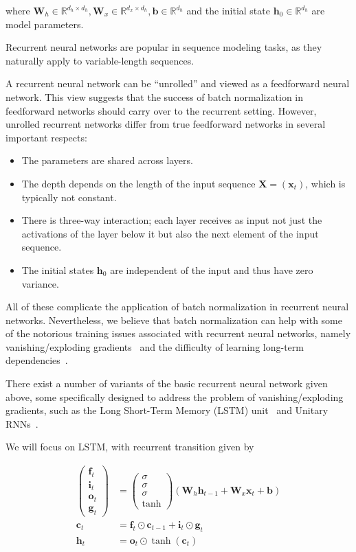 \documentclass{article} %
\newcommand{\vect}[1]{\mathbf{#1}}
\newcommand{\mat}[1]{\mathbf{#1}}
\newcommand{\ewprod}{\odot}
\newcommand{\reals}{\mathbb{R}}
\begin{document}
where $\mat{W}_h \in \reals^{d_h \times d_h},
       \mat{W}_x \in \reals^{d_x \times d_h},
       \vect{b} \in \reals^{d_h}$
  and the initial state $\vect{h}_0 \in \reals^{d_h}$
  are model parameters.

Recurrent neural networks are popular in sequence modeling tasks, as they naturally apply to variable-length sequences.

A recurrent neural network can be ``unrolled'' and viewed as a feedforward neural network.
This view suggests that the success of batch normalization in feedforward networks should carry over to the recurrent setting.
However, unrolled recurrent networks differ from true feedforward networks in several important respects:
\begin{itemize}
\item The parameters are shared across layers.
\item The depth depends on the length of the input sequence $\mat{X} = (\vect{x}_t)$, which is typically not constant.
\item There is three-way interaction; each layer receives as input not just the activations of the layer below it but also the next element of the input sequence.
\item The initial states $\vect{h}_0$ are independent of the input and thus have zero variance.
\end{itemize}

All of these complicate the application of batch normalization in recurrent neural networks.
Nevertheless, we believe that batch normalization can help with some of the notorious training issues associated with recurrent neural networks, namely vanishing/exploding gradients~\cite{somebody} and the difficulty of learning long-term dependencies~\cite{somebody else}.

There exist a number of variants of the basic recurrent neural network given above, some specifically designed to address the problem of vanishing/exploding gradients, such as the Long Short-Term Memory (LSTM) unit~\cite{lstm} and Unitary RNNs~\cite{urnn}.

We will focus on LSTM, with recurrent transition given by

\begin{align}
\left(\begin{array}{ccc}
\vect{f}_t \\
\vect{i}_t \\
\vect{o}_t \\
\vect{g}_t
\end{array}\right)
 &=
\left(\begin{array}{ccc}
\sigma \\
\sigma \\
\sigma \\
\tanh
\end{array}\right)
\left(
 \mat{W}_h \vect{h}_{t-1} +
 \mat{W}_x \vect{x}_t +
 \vect{b}
\right) \\
\vect{c}_t &= \vect{f}_t \ewprod \vect{c}_{t-1} +
              \vect{i}_t \ewprod \vect{g}_t \\
\vect{h}_t &= \vect{o}_t \ewprod \tanh(\vect{c}_t)
\end{align}
\end{document}

